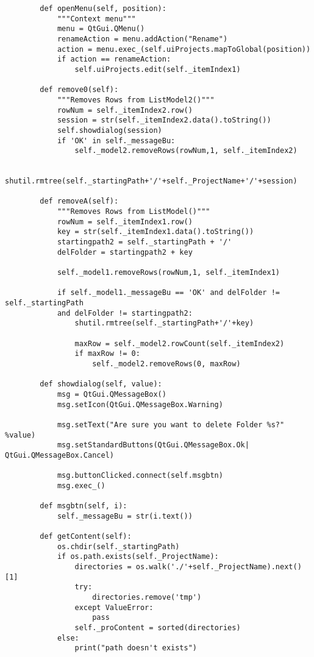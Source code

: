 \begin{verbatim}
        def openMenu(self, position):
            """Context menu"""
            menu = QtGui.QMenu()
            renameAction = menu.addAction("Rename")
            action = menu.exec_(self.uiProjects.mapToGlobal(position))
            if action == renameAction:
                self.uiProjects.edit(self._itemIndex1)
    
        def remove0(self):
            """Removes Rows from ListModel2()"""
            rowNum = self._itemIndex2.row()
            session = str(self._itemIndex2.data().toString())
            self.showdialog(session)
            if 'OK' in self._messageBu:
                self._model2.removeRows(rowNum,1, self._itemIndex2)
    
                shutil.rmtree(self._startingPath+'/'+self._ProjectName+'/'+session)
    
        def removeA(self):
            """Removes Rows from ListModel()"""
            rowNum = self._itemIndex1.row()
            key = str(self._itemIndex1.data().toString())
            startingpath2 = self._startingPath + '/'
            delFolder = startingpath2 + key
    
            self._model1.removeRows(rowNum,1, self._itemIndex1)
    
            if self._model1._messageBu == 'OK' and delFolder != self._startingPath 
            and delFolder != startingpath2:
                shutil.rmtree(self._startingPath+'/'+key)
    
                maxRow = self._model2.rowCount(self._itemIndex2)
                if maxRow != 0:
                    self._model2.removeRows(0, maxRow)
    
        def showdialog(self, value):
            msg = QtGui.QMessageBox()
            msg.setIcon(QtGui.QMessageBox.Warning)
    
            msg.setText("Are sure you want to delete Folder %s?" %value)
            msg.setStandardButtons(QtGui.QMessageBox.Ok| QtGui.QMessageBox.Cancel)
    
            msg.buttonClicked.connect(self.msgbtn)
            msg.exec_()
    
        def msgbtn(self, i):
            self._messageBu = str(i.text())
    
        def getContent(self):
            os.chdir(self._startingPath)
            if os.path.exists(self._ProjectName):
                directories = os.walk('./'+self._ProjectName).next()[1]
                try:
                    directories.remove('tmp') 
                except ValueError:
                    pass
                self._proContent = sorted(directories)
            else:
                print("path doesn't exists")
    

\end{verbatim}

